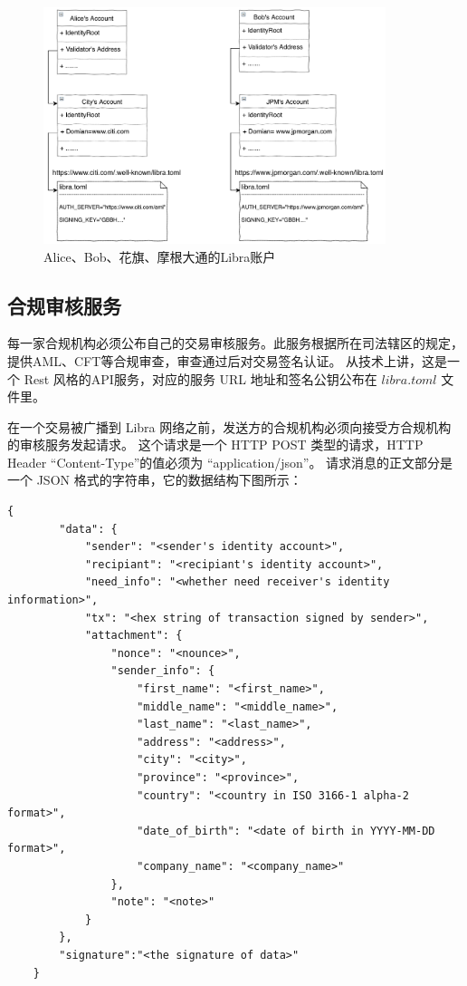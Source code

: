 \begin{figure}[h!]
    \centering
    \includegraphics[width=10cm, keepaspectratio]{images/alice_bob.png}
    \caption{Alice、Bob、花旗、摩根大通的Libra账户}
    \label{fig:accounts}
\end{figure}

\subsection{合规审核服务}
每一家合规机构必须公布自己的交易审核服务。此服务根据所在司法辖区的规定，提供AML、CFT等合规审查，审查通过后对交易签名认证。
从技术上讲，这是一个 Rest 风格的API服务，对应的服务 URL 地址和签名公钥公布在 $libra.toml$ 文件里。 


在一个交易被广播到 Libra 网络之前，发送方的合规机构必须向接受方合规机构的审核服务发起请求。
这个请求是一个 HTTP POST 类型的请求，HTTP Header “Content-Type”的值必须为 “application/json”。
请求消息的正文部分是一个 JSON 格式的字符串，它的数据结构下图所示：

\begin{lstlisting}[caption={审核服务请求}, label={lst:auth_request}]
    {
        "data": {
            "sender": "<sender's identity account>",
            "recipiant": "<recipiant's identity account>",
            "need_info": "<whether need receiver's identity information>",
            "tx": "<hex string of transaction signed by sender>",
            "attachment": {
                "nonce": "<nounce>",
                "sender_info": {
                    "first_name": "<first_name>",
                    "middle_name": "<middle_name>",
                    "last_name": "<last_name>",
                    "address": "<address>",
                    "city": "<city>",
                    "province": "<province>",
                    "country": "<country in ISO 3166-1 alpha-2 format>",
                    "date_of_birth": "<date of birth in YYYY-MM-DD format>",
                    "company_name": "<company_name>"
                },
                "note": "<note>"
            }
        },
        "signature":"<the signature of data>"
    }
\end{lstlisting}

